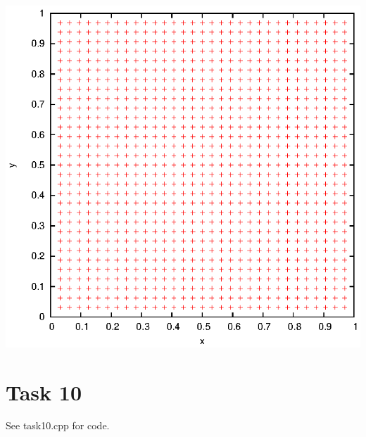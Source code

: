 \documentclass[]{article}
\begin{document}
\includegraphics{task9_trapezoidal}\\

\section*{Task 10}
See task10.cpp for code.
\end{document}
